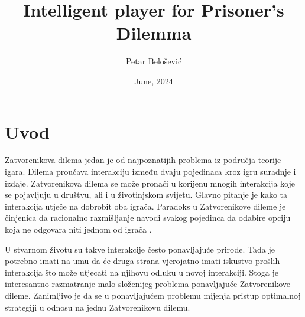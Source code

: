 \documentclass[zavrsnirad]{fer}
\title{Intelligent player for Prisoner's Dilemma}
\author{Petar Belošević}
\date{June, 2024}
\begin{document}
\maketitle






\begin{zahvale}
\end{zahvale}


\mainmatter


\tableofcontents


\chapter{Uvod}
\label{pog:uvod}

	Zatvorenikova dilema jedan je od najpoznatijih problema iz područja teorije igara. Dilema proučava interakciju između dvaju pojedinaca kroz igru suradnje i izdaje. Zatvorenikova dilema se može pronaći u korijenu mnogih interakcija koje se pojavljuju u društvu, ali i u životinjskom svijetu. Glavno pitanje je kako ta interakcija utječe na dobrobit oba igrača. Paradoks u Zatvorenikove dileme je činjenica da racionalno razmišljanje navodi svakog pojedinca da odabire opciju koja ne odgovara niti jednom od igrača \cite{PrisDilemmaHrEnc}.
	
	U stvarnom životu su takve interakcije često ponavljajuće prirode. Tada je potrebno imati na umu da će druga strana vjerojatno imati iskustvo prošlih interakcija što može utjecati na njihovu odluku u novoj interakciji. Stoga je interesantno razmatranje malo složenijeg problema ponavljajuće Zatvorenikove dileme. Zanimljivo je da se u ponavljajućem problemu mijenja pristup optimalnoj strategiji u odnosu na jednu Zatvorenikovu dilemu.
	
\end{document}
